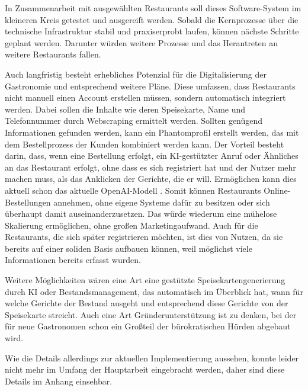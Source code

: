 In Zusammenarbeit mit ausgewählten Restaurants soll dieses Software-System im kleineren Kreis getestet und ausgereift werden. Sobald die Kernprozesse über die technische Infrastruktur stabil und praxiserprobt laufen, können nächste Schritte geplant werden. Darunter würden weitere Prozesse und das Herantreten an weitere Restaurants fallen. 

Auch langfristig besteht erhebliches Potenzial für die Digitalisierung der Gastronomie und entsprechend weitere Pläne. Diese umfassen, dass Restaurants nicht manuell einen Account erstellen müssen, sondern automatisch integriert werden. Dabei sollen die Inhalte wie deren Speisekarte, Name und Telefonnummer durch Webscraping ermittelt werden. Sollten genügend Informationen gefunden werden, kann ein Phantomprofil erstellt werden, das mit dem Bestellprozess der Kunden kombiniert werden kann. Der Vorteil besteht darin, dass, wenn eine Bestellung erfolgt, ein \acs{KI}-gestützter Anruf oder Ähnliches an das Restaurant erfolgt, ohne dass es sich registriert hat und der Nutzer mehr machen muss, als das Anklicken der Gerichte, die er will. Ermöglichen kann dies aktuell schon das aktuelle OpenAI-Modell \citep[vgl.][]{openai_introducing_2024}. Somit können Restaurants Online-Bestellungen annehmen, ohne eigene Systeme dafür zu besitzen oder sich überhaupt damit auseinanderzusetzen. Das würde wiederum eine mühelose Skalierung ermöglichen, ohne großen Marketingaufwand. Auch für die Restaurants, die sich später registrieren möchten, ist dies von Nutzen, da sie bereits auf einer soliden Basis aufbauen können, weil möglichst viele Informationen bereits erfasst wurden.

Weitere Möglichkeiten wären eine Art eine gestützte Speisekartengenerierung durch \acs{KI} oder Bestandsmanagement, das automatisch im Überblick hat, wann für welche Gerichte der Bestand ausgeht und entsprechend diese Gerichte von der Speisekarte streicht. Auch eine Art Gründerunterstützung ist zu denken, bei der für neue Gastronomen schon ein Großteil der bürokratischen Hürden abgebaut wird.

Wie die Details allerdings zur aktuellen Implementierung aussehen, konnte leider nicht mehr im Umfang der Hauptarbeit eingebracht werden, daher sind diese Details im Anhang einsehbar.